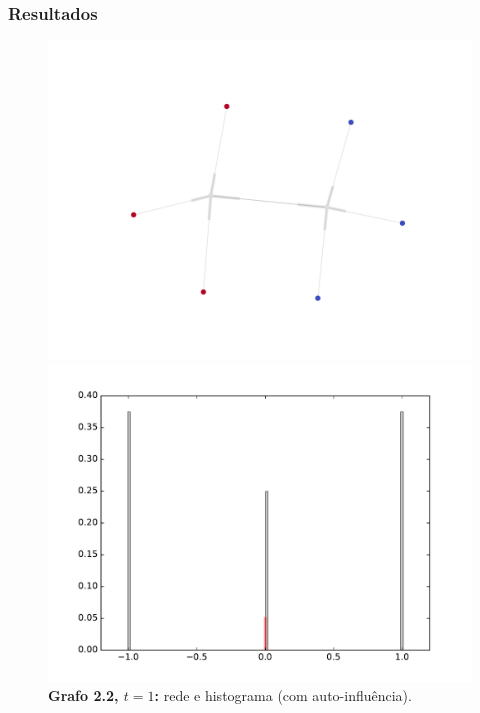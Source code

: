 \begin{frame}
  \frametitle{Resultados}

  \begin{figure}
  \centering
  \begin{minipage}{5.5cm}
    \includegraphics[width=\textwidth]{./figures/22SIN1}
  \end{minipage}
  \begin{minipage}{5.5cm}
    \includegraphics[width=\textwidth]{./figures/22SIH1}
  \end{minipage}
  \vspace{5mm}
  \caption*{\textbf{Grafo 2.2, $t = 1$:} rede e histograma (com auto-influência).}
  \end{figure}
\end{frame}

